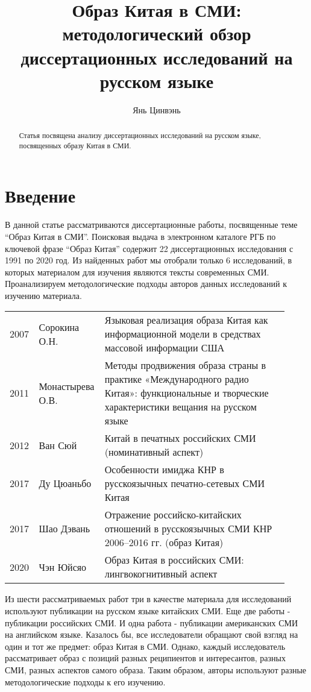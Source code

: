 \documentclass[11pt]{article}
\title{Образ Китая в СМИ: методологический обзор диссертационных исследований на русском языке}
\author{Янь Цинвэнь}
\begin{document}
\maketitle

\begin{abstract}

Статья посвящена анализу диссертационных исследований на русском языке, посвященных образу Китая в СМИ.

\end{abstract}

\large
\section{Введение}\label{sec:intro}

В данной статье рассматриваются диссертационные работы, посвященные теме ``Образ Китая в СМИ''.
Поисковая выдача в электронном каталоге РГБ по ключевой фразе ``Образ Китая'' содержит 22 диссертационных исследования с 1991 по 2020 год.
Из найденных работ мы отобрали только 6 исследований, в которых материалом для изучения являются тексты современных СМИ.
Проанализируем методологические подходы авторов данных исследований к изучению материала.

\small
\begin{center}
    \begin{tabular}{ p{0.07\linewidth} p{0.2\linewidth} p{0.65\linewidth} }
        2007 & Сорокина О.Н. & Языковая реализация образа Китая как информационной модели в средствах массовой информации США \\
        2011 & Монастырева О.В. & Методы продвижения образа страны в практике «Международного радио Китая»: функциональные и творческие характеристики вещания на русском языке \\
        2012 & Ван Сюй & Китай в печатных российских СМИ (номинативный аспект) \\
        2017 & Ду Цюаньбо & Особенности имиджа КНР в русскоязычных печатно-сетевых СМИ Китая \\
        2017 & Шао Дэвань & Отражение российско-китайских отношений в русскоязычных СМИ КНР 2006--2016 гг. (образ Китая) \\
        2020 & Чэн Юйсяо & Образ Китая в российских СМИ: лингвокогнитивный аспект \\
    \end{tabular}
\end{center}	

\large

Из шести рассматриваемых работ три в качестве материала для исследований используют публикации на русском языке китайских СМИ.
Еще две работы - публикации российских СМИ.
И одна работа - публикации американских СМИ на английском языке.
Казалось бы, все исследователи обращают свой взгляд на один и тот же предмет: образ Китая в СМИ.
Однако, каждый исследователь рассматривает образ с позиций разных реципиентов и интересантов, разных СМИ, разных аспектов самого образа.
Таким образом, авторы используют разные методологические подходы к его изучению.
\end{document}
